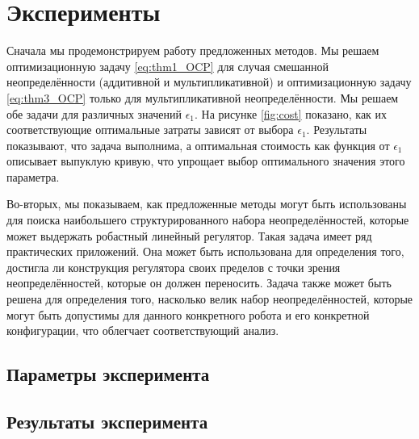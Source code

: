 \section{Эксперименты}\label{sec:ch4/sect3}
Сначала мы продемонстрируем работу предложенных методов. Мы решаем оптимизационную задачу \eqref{eq:thm1_OCP} для случая смешанной неопределённости (аддитивной и мультипликативной) и оптимизационную задачу \eqref{eq:thm3_OCP} только для мультипликативной неопределённости. Мы решаем обе задачи для различных значений $\epsilon_1$. На рисунке \ref{fig:cost} показано, как их соответствующие оптимальные затраты зависят от выбора $\epsilon_1$. Результаты показывают, что задача выполнима, а оптимальная стоимость как функция от $\epsilon_1$ описывает выпуклую кривую, что упрощает выбор оптимального значения этого параметра.

Во-вторых, мы показываем, как предложенные методы могут быть использованы для поиска наибольшего структурированного набора неопределённостей, которые может выдержать робастный линейный регулятор. Такая задача имеет ряд практических приложений. Она может быть использована для определения того, достигла ли конструкция регулятора своих пределов с точки зрения неопределённостей, которые он должен переносить. Задача также может быть решена для определения того, насколько велик набор неопределённостей, которые могут быть допустимы для данного конкретного робота и его конкретной конфигурации, что облегчает соответствующий анализ.

\subsection{Параметры эксперимента}\label{sec:ch4/sect3/sub1}
\subsection{Результаты эксперимента}\label{sec:ch4/sect3/sub2}
